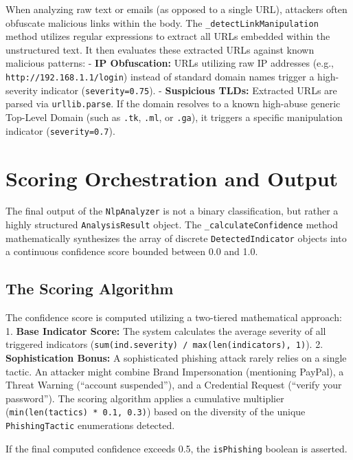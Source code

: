 When analyzing raw text or emails (as opposed to a single URL),
attackers often obfuscate malicious links within the body. The
\texttt{\_detectLinkManipulation} method utilizes regular expressions to
extract all URLs embedded within the unstructured text. It then
evaluates these extracted URLs against known malicious patterns: -
\textbf{IP Obfuscation:} URLs utilizing raw IP addresses (e.g.,
\texttt{http://192.168.1.1/login}) instead of standard domain names
trigger a high-severity indicator (\texttt{severity=0.75}). -
\textbf{Suspicious TLDs:} Extracted URLs are parsed via
\texttt{urllib.parse}. If the domain resolves to a known high-abuse
generic Top-Level Domain (such as \texttt{.tk}, \texttt{.ml}, or
\texttt{.ga}), it triggers a specific manipulation indicator
(\texttt{severity=0.7}).

\section{Scoring Orchestration and
Output}\label{scoring-orchestration-and-output}

The final output of the \texttt{NlpAnalyzer} is not a binary
classification, but rather a highly structured \texttt{AnalysisResult}
object. The \texttt{\_calculateConfidence} method mathematically
synthesizes the array of discrete \texttt{DetectedIndicator} objects
into a continuous confidence score bounded between 0.0 and 1.0.

\subsection{The Scoring Algorithm}\label{the-scoring-algorithm}

The confidence score is computed utilizing a two-tiered mathematical
approach: 1. \textbf{Base Indicator Score:} The system calculates the
average severity of all triggered indicators
(\texttt{sum(ind.severity)\ /\ max(len(indicators),\ 1)}). 2.
\textbf{Sophistication Bonus:} A sophisticated phishing attack rarely
relies on a single tactic. An attacker might combine Brand Impersonation
(mentioning PayPal), a Threat Warning (``account suspended''), and a
Credential Request (``verify your password''). The scoring algorithm
applies a cumulative multiplier
(\texttt{min(len(tactics)\ *\ 0.1,\ 0.3)}) based on the diversity of the
unique \texttt{PhishingTactic} enumerations detected.

If the final computed confidence exceeds 0.5, the \texttt{isPhishing}
boolean is asserted.

